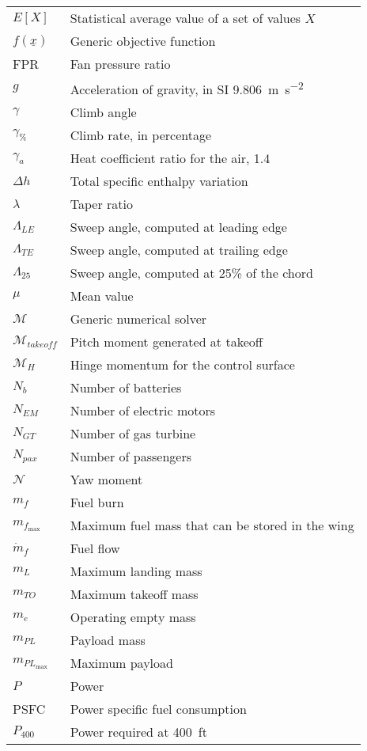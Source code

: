 \begin{longtable*}{@{}l @{\quad=\quad} p{14.8cm}@{}}
	$E\left[X\right]$ & Statistical average value of a set of values $X$ \\
	$f\left(\underline{x}\right)$ & Generic objective function \\
	FPR & Fan pressure ratio \\
	$g$ & Acceleration of gravity, in SI 9.806~\si{\meter\per\square\second} \\
	$\gamma$ & Climb angle \\
	$\gamma_{\%}$ & Climb rate, in percentage \\
	$\gamma_a$ & Heat coefficient ratio for the air, 1.4 \\
	$\Delta h$ & Total specific enthalpy variation \\
	$\lambda$ & Taper ratio \\
	$\Lambda_{LE}$ & Sweep angle, computed at leading edge \\
	$\Lambda_{TE}$ & Sweep angle, computed at trailing edge \\
	$\Lambda_{25}$ & Sweep angle, computed at 25\% of the chord \\
	$\mu$ & Mean value \\
	$\mathcal{M}$ & Generic numerical solver \\
	$\mathcal{M}_{takeoff}$ & Pitch moment generated at takeoff \\
	$\mathcal{M}_{H}$ & Hinge momentum for the control surface \\
	$N_b$ & Number of batteries \\
	$N_{EM}$ & Number of electric motors \\
	$N_{GT}$ & Number of gas turbine \\
	$N_{pax}$ & Number of passengers \\
	$\mathcal{N}$ & Yaw moment \\
	$m_f$ & Fuel burn \\
	$m_{f_{\max}}$ & Maximum fuel mass that can be stored in the wing \\
	$\dot{m}_f$ & Fuel flow \\
	$m_{L}$ & Maximum landing mass \\
	$m_{TO}$ & Maximum takeoff mass \\
	$m_{e}$ & Operating empty mass \\
	$m_{PL}$ & Payload mass \\
	$m_{PL_{\max}}$ & Maximum payload \\
	$P$ & Power \\
	PSFC & Power specific fuel consumption \\
	$P_{400}$ & Power required at 400~ft \\

\end{longtable*}
